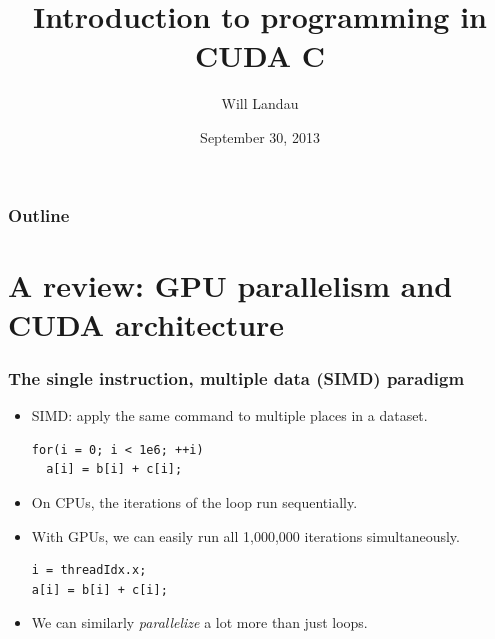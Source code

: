 \documentclass[handout]{beamer}
\title{Introduction to programming in CUDA C}
\author{Will Landau}
\date{September 30, 2013}
\institute{Iowa State University}
\numberwithin{equation}{section}
\begin{document}
\begin{frame}
\titlepage
 \end{frame}
 
 \begin{frame}
\frametitle{Outline}
\tableofcontents
\end{frame}
 

\section{A review: GPU parallelism and CUDA architecture}

\begin{frame}[fragile]
\frametitle{The single instruction, multiple data (SIMD) paradigm}

\begin{itemize}
\pause \item SIMD: apply the same command to multiple places in a dataset. 

\pause \begin{lstlisting}
for(i = 0; i < 1e6; ++i)
  a[i] = b[i] + c[i];
\end{lstlisting}


\pause \item On CPUs, the iterations of the loop run sequentially.

\pause \item With GPUs, we can easily run all 1,000,000 iterations simultaneously.

\pause \begin{lstlisting}
i = threadIdx.x;
a[i] = b[i] + c[i];
\end{lstlisting}

\pause \item We can similarly \emph{parallelize} a lot more than just loops.
\end{itemize}
\end{frame}
\end{document}
